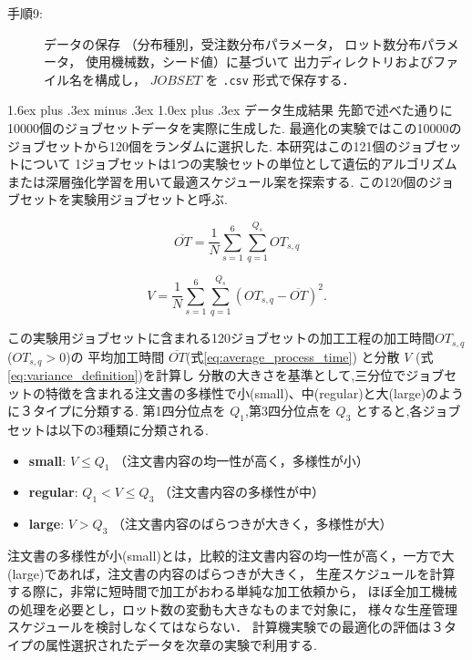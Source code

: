 \documentclass{jarticle}
\makeatletter
\renewcommand{\subsection}{%
  \@startsection{subsection}{2}{\z@}%
  {1.6ex plus .3ex minus .3ex}%
  {1.0ex plus .3ex}%
  {\LARGE\bfseries}%
}
\makeatother
\begin{document}
\begin{description}
  \item[手順9:] データの保存
  （分布種別，受注数分布パラメータ，
  ロット数分布パラメータ，
  使用機械数，シード値）に基づいて
  出力ディレクトリおよびファイル名を構成し，
  $JOBSET$ を \texttt{.csv} 形式で保存する．
\end{description}

\subsection{データ生成結果}
先節で述べた通りに10000個のジョブセットデータを実際に生成した.
最適化の実験ではこの10000のジョブセットから120個をランダムに選択した.
本研究はこの121個のジョブセットについて
1ジョブセットは1つの実験セットの単位として遺伝的アルゴリズムまたは深層強化学習を用いて最適スケジュール案を探索する.
この120個のジョブセットを実験用ジョブセットと呼ぶ.

\begin{equation}
\overline{OT}
=
\frac{1}{N}
\sum_{s=1}^{6}
\sum_{q=1}^{Q_s}
OT_{s,q}
\label{eq:average_process_time}
\end{equation}

\begin{equation}
V
=
\frac{1}{N}
\sum_{s=1}^{6}
\sum_{q=1}^{Q_s}
\left( OT_{s,q} - \overline{OT} \right)^2 .
\label{eq:variance_definition}
\end{equation}

この実験用ジョブセットに含まれる120ジョブセットの加工工程の加工時間$OT_{s,q}$($OT_{s,q}>0$)の
平均加工時間 $\overline{OT}$(式\ref{eq:average_process_time}) と分散 $V$ (式\ref{eq:variance_definition})を計算し
分散の大きさを基準として,三分位でジョブセットの特徴を含まれる注文書の多様性で小(small)、中(regular)と大(large)のように３タイプに分類する.
第1四分位点を $Q_1$,第3四分位点を $Q_3$ とすると,各ジョブセットは以下の3種類に分類される.
\begin{itemize}
  \item \textbf{small}:
  $V \le Q_1$
  （注文書内容の均一性が高く，多様性が小）
  \item \textbf{regular}:
  $Q_1 < V \le Q_3$
  （注文書内容の多様性が中）
  \item \textbf{large}:
  $V > Q_3$
  （注文書内容のばらつきが大きく，多様性が大）
\end{itemize}

注文書の多様性が小(small)とは，比較的注文書内容の均一性が高く，一方で大(large)であれば，注文書の内容のばらつきが大きく，
生産スケジュールを計算する際に，非常に短時間で加工がおわる単純な加工依頼から，
ほぼ全加工機械の処理を必要とし，ロット数の変動も大きなものまで対象に，
様々な生産管理スケジュールを検討しなくてはならない．
計算機実験での最適化の評価は３タイプの属性選択されたデータを次章の実験で利用する.
\end{document}
